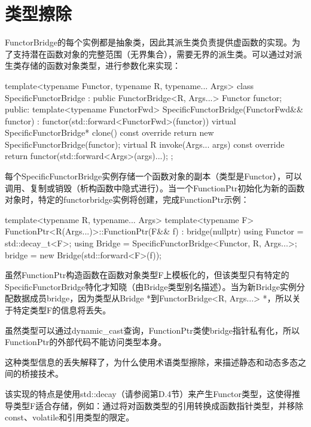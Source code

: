 \section{类型擦除}
FunctorBridge的每个实例都是抽象类，因此其派生类负责提供虚函数的实现。为了支持潜在函数对象的完整范围（无界集合），需要无界的派生类。可以通过对派生类存储的函数对象类型，进行参数化来实现：

\begin{cpp}
template<typename Functor, typename R, typename... Args>
class SpecificFunctorBridge : public FunctorBridge<R, Args...> {
	Functor functor;
	public:
	template<typename FunctorFwd>
	SpecificFunctorBridge(FunctorFwd&& functor)
	: functor(std::forward<FunctorFwd>(functor)) {
	}
	virtual SpecificFunctorBridge* clone() const override {
		return new SpecificFunctorBridge(functor);
	}
	virtual R invoke(Args... args) const override {
		return functor(std::forward<Args>(args)...);
	}
};
\end{cpp}

每个SpecificFunctorBridge实例存储一个函数对象的副本（类型是Functor），可以调用、复制或销毁（析构函数中隐式进行）。当一个FunctionPtr初始化为新的函数对象时，特定的functorbridge实例将创建，完成FunctionPtr示例：

\begin{cpp}
template<typename R, typename... Args>
template<typename F>
FunctionPtr<R(Args...)>::FunctionPtr(F&& f)
: bridge(nullptr)
{
	using Functor = std::decay_t<F>;
	using Bridge = SpecificFunctorBridge<Functor, R, Args...>;
	bridge = new Bridge(std::forward<F>(f));
}
\end{cpp}

虽然FunctionPtr构造函数在函数对象类型F上模板化的，但该类型只有特定的SpecificFunctorBridge特化才知晓（由Bridge类型别名描述）。当为新Bridge实例分配数据成员bridge，因为类型从Bridge *到FunctorBridge<R, Args...> *，所以关于特定类型F的信息将丢失。

\begin{notice}
虽然类型可以通过dynamic\_cast查询，FunctionPtr类使bridge指针私有化，所以FunctionPtr的外部代码不能访问类型本身。
\end{notice}

这种类型信息的丢失解释了，为什么使用术语类型擦除，来描述静态和动态多态之间的桥接技术。

该实现的特点是使用std::decay（请参阅第D.4节）来产生Functor类型，这使得推导类型F适合存储，例如：通过将对函数类型的引用转换成函数指针类型，并移除const、volatile和引用类型的限定。







































